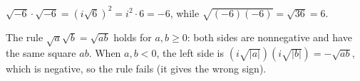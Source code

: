 $\sqrt{-6}\cdot\sqrt{-6}=\left(i\sqrt6\right)^2=i^2\cdot6=\boxed{-6}$, while $\sqrt{(-6)(-6)}=\sqrt{36}=\boxed{6}$.

The rule $\sqrt a\sqrt b=\sqrt{ab}$ holds for $a,b\ge0$: both sides are nonnegative and have the same square $ab$. When $a,b<0$, the left side is $\left(i\sqrt{|a|}\right)\left(i\sqrt{|b|}\right)=-\sqrt{ab}$, which is negative, so the rule fails (it gives the wrong sign).
